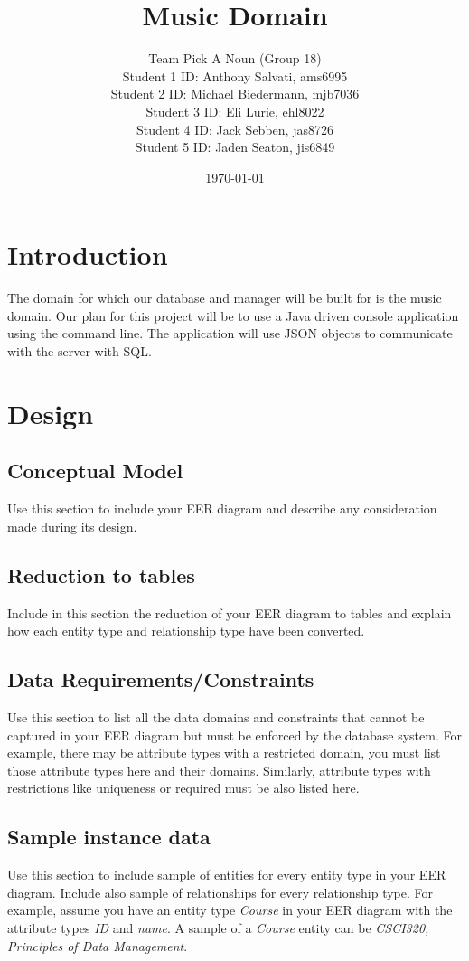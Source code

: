 \documentclass[12pt]{article}
\title{Music Domain}
\date{\today}
\author{Team Pick A Noun (Group 18) \\
Student 1 ID: Anthony Salvati, ams6995\\
        Student 2 ID: Michael Biedermann, mjb7036\\
        Student 3 ID: Eli Lurie, ehl8022\\
        Student 4 ID: Jack Sebben, jas8726\\
        Student 5 ID: Jaden Seaton, jis6849\\
        }
\begin{document}
\maketitle

\section{Introduction}
    \quad The domain for which our database and manager will be built for is the music domain. Our plan for this project will be to use a Java driven console application using the command line. The application will use JSON objects to communicate with the server with SQL. 


\section{Design}
\subsection{Conceptual Model}
Use this section to include your EER diagram and describe any consideration made during its design.
\subsection{Reduction to tables}
Include in this section the reduction of your EER diagram to tables and explain how each entity type and relationship type have been converted.
\subsection{Data Requirements/Constraints}
Use this section to list all the data domains and constraints that cannot be captured in your EER diagram but must be enforced by the database system. For example, there may be attribute types with a restricted domain, you must list those attribute types here and their domains. Similarly, attribute types with restrictions like uniqueness or required must be also listed here.
\subsection{Sample instance data}
Use this section to include sample of entities for every entity type in your EER diagram. Include also sample of relationships for every relationship type. For example, assume you have an entity type \emph{Course} in your EER diagram with the attribute types \emph{ID} and \emph{name}. A sample of a \emph{Course} entity can be \emph{CSCI320, Principles of Data Management}.\\
\end{document}

